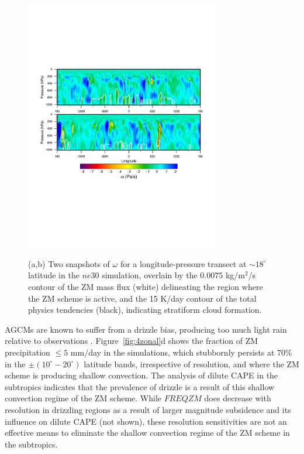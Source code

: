 \documentclass[times]{qjrms4}
\begin{document}
\begin{figure}
\begin{center}
\noindent\includegraphics[width=20pc,angle=0]{figs/temp_trans.pdf}\\
\end{center}
\caption{(a,b) Two snapshots of $\omega$ for a longitude-pressure transect at $\sim 18^{\circ}$ latitude in the $ne30$ simulation, overlain by the $0.0075$ kg/m$^2$/s contour of the ZM mass flux (white) delineating the region where the ZM scheme is active, and the 15 K/day contour of the total physics tendencies (black), indicating stratiform cloud formation.}
\label{fig:transect}
\end{figure}

AGCMs are known to suffer from a drizzle bias, producing too much light rain relative to observations \citep{D2006JCLIM}. Figure~\ref{fig:4zonal}d shows the fraction of ZM precipitation $\leq 5$ mm/day in the simulations, which stubbornly persists at 70\% in the $\pm \left(10^{\circ}-20^{\circ} \right)$ latitude bands, irrespective of resolution, and where the ZM scheme is producing shallow convection. The analysis of dilute CAPE in the subtropics indicates that the prevalence of drizzle is a result of this shallow convection regime of the ZM scheme. While $FREQZM$ does decrease with resolution in drizzling regions as a result of larger magnitude subsidence and its influence on dilute CAPE (not shown), these resolution sensitivities are not an effective means to eliminate the shallow convection regime of the ZM scheme in the subtropics.
\end{document}

